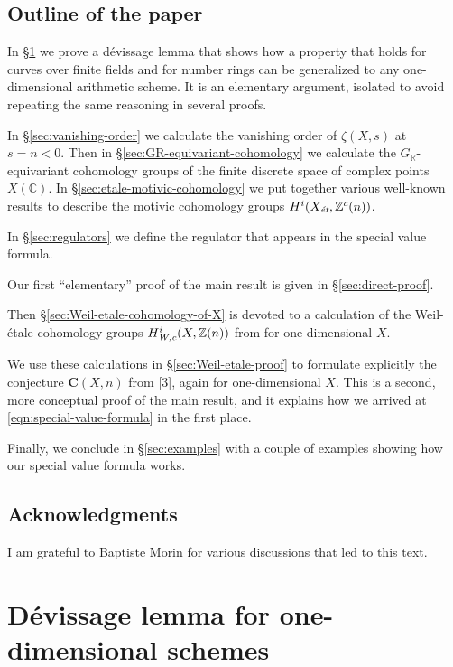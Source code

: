 \documentclass[draft]{article}
\newcommand{\CC}{\mathbb{C}}
\newcommand{\RR}{\mathbb{R}}
\newcommand{\ZZ}{\mathbb{Z}}
\newcommand{\et}{\text{\it \'{e}t}}
\newcommand{\Wc}{\text{\it W,c}}
\theoremstyle{myplain}
\theoremstyle{mydefinition}
\begin{document}
\subsection*{Outline of the paper}

In \S\ref{sec:devissage} we prove a d\'{e}vissage lemma that shows how a
property that holds for curves over finite fields and for number rings can be
generalized to any one-dimensional arithmetic scheme. It is an elementary
argument, isolated to avoid repeating the same reasoning in several proofs.

In \S\ref{sec:vanishing-order} we calculate the vanishing order of $\zeta (X,s)$
at $s = n < 0$. Then in \S\ref{sec:GR-equivariant-cohomology} we calculate the
$G_\RR$-equivariant cohomology groups of the finite discrete space of complex
points $X(\CC)$. In \S\ref{sec:etale-motivic-cohomology} we put together various
well-known results to describe the motivic cohomology groups
$H^i (X_\et, \ZZ^c(n))$.

In \S\ref{sec:regulators} we define the regulator that appears in the special
value formula.

Our first ``elementary'' proof of the main result is given in
\S\ref{sec:direct-proof}.

Then \S\ref{sec:Weil-etale-cohomology-of-X} is devoted to a calculation of the
Weil-\'{e}tale cohomology groups $H^i_\Wc (X, \ZZ(n))$ from
\cite{Beshenov-Weil-etale-1} for one-dimensional $X$.

We use these calculations in \S\ref{sec:Weil-etale-proof} to formulate
explicitly the conjecture $\mathbf{C} (X,n)$ from [3], again for one-dimensional
$X$. This is a second, more conceptual proof of the main result, and it explains
how we arrived at \eqref{eqn:special-value-formula} in the first place.

Finally, we conclude in \S\ref{sec:examples} with a couple of examples showing
how our special value formula works.

\subsection*{Acknowledgments}

I am grateful to Baptiste Morin for various discussions that led to this text.


\section{D\'{e}vissage lemma for one-dimensional schemes}
\label{sec:devissage}
\end{document}

